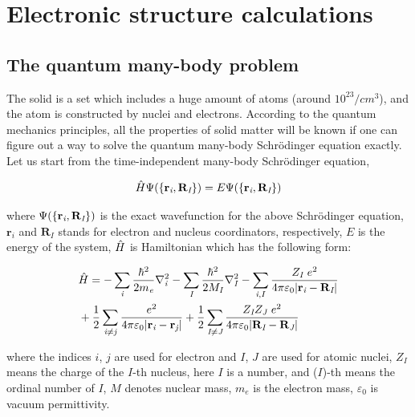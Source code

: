 \documentclass[a4paper, 12pt, titlepage,oneside,drop]{kthesis}
\begin{document}
\chapter{Electronic structure calculations }
\label{ch:dft}

\section{The quantum many-body problem}
\label{ch:mb}

\noindent The solid is a set which includes a huge amount of atoms (around $10^{23}/cm^3$), and the atom is constructed by nuclei and electrons. 
According to the quantum mechanics principles, all the properties of solid matter will be known if one can figure out a way to solve 
the quantum many-body Schrödinger equation exactly. Let us start from the time-independent many-body Schrödinger equation,

 
\begin{equation}\label{ssth}
 {\hat{H}} {\Psi(\{ {\textbf r}_{\textit i}, {\textbf R}_{\textit I} \})} = {E} {\Psi(\{ {\textbf r}_{\textit i}, {\textbf R}_{\textit I} \})}
\end{equation}

\noindent where $\Psi(\{ {\textbf r}_{\textit i}, {\textbf R}_{\textit I} \})$  is the exact wavefunction for the above Schrödinger equation, $\textbf{r}_\textit{i}$ and $\textbf{R}_\textit{I}$  stands for electron and
nucleus coordinators, respectively, $E$ is the energy of the system, $\hat{H}$ is Hamiltonian which has the following form:

\begin{equation}\label{th}
\begin{split}
& \hath = - \sumi<i> {\frac{\hbar^{2}}{2 m_{\textit e}}}   \nablaia<i> - \sumi<I> {\frac{\hbar^{2}}{2 M_\textit{I}}} \nablaia<I>  - \sumij<i><I> \frac{Z_\textit{I}\ e^2}{4 \pi \varepsilon_0 |\textbf{r}_\textit{i}-\textbf{R}_\textit{I}|} \\
& + \frac{1}{2} \suminj<i><j> \frac{ e^2}{4 \pi \varepsilon_0 |\textbf{r}_\textit{i}-\textbf{r}_\textit{j}|} + \frac{1}{2} \suminj<I><J> \frac{Z_\textit{I} Z_\textit{J}\  e^2}{4 \pi \varepsilon_0 |\textbf{R}_\textit{I}-\textbf{R}_\textit{J}|}
\end{split}
\end{equation}


\noindent where the indices $\textit{i}$, $\textit{j}$ are used for electron and $\textit{I}$, $\textit{J}$ are used for atomic nuclei, $Z_\textit{I}$ means the charge of the $\textit{I}$-th nucleus,
here  $\textit{I}$ is a number, and ($\textit{I}$)-th means the ordinal number of $\textit{I}$, $\textit{M}$ denotes nuclear mass, $m_e$ is the electron mass, $\varepsilon_0$ is vacuum permittivity.
\end{document}
